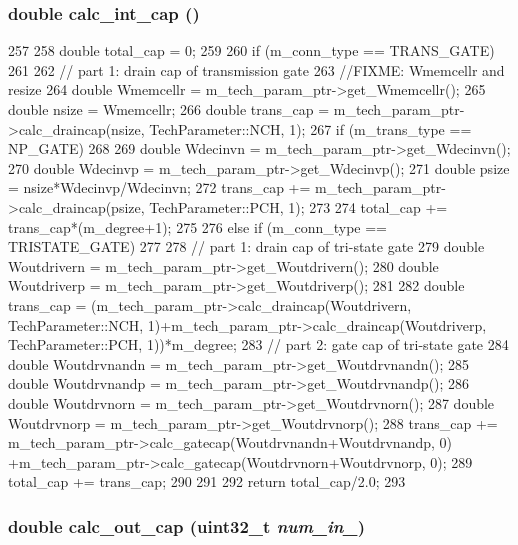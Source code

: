 \hypertarget{classCrossbar_a16e2ab6e99c8b2e72fb306b6d6094699}{
\subsubsection[{calc\_\-int\_\-cap}]{\setlength{\rightskip}{0pt plus 5cm}double calc\_\-int\_\-cap ()}}
\label{classCrossbar_a16e2ab6e99c8b2e72fb306b6d6094699}



\begin{DoxyCode}
257 {
258     double total_cap = 0;
259 
260     if (m_conn_type == TRANS_GATE)
261     {
262         // part 1: drain cap of transmission gate
263         //FIXME: Wmemcellr and resize
264         double Wmemcellr = m_tech_param_ptr->get_Wmemcellr();
265         double nsize = Wmemcellr;
266         double trans_cap = m_tech_param_ptr->calc_draincap(nsize, 
      TechParameter::NCH, 1);
267         if (m_trans_type == NP_GATE)
268         {
269             double Wdecinvn = m_tech_param_ptr->get_Wdecinvn();
270             double Wdecinvp = m_tech_param_ptr->get_Wdecinvp();
271             double psize = nsize*Wdecinvp/Wdecinvn;
272             trans_cap += m_tech_param_ptr->calc_draincap(psize, 
      TechParameter::PCH, 1);
273         }
274         total_cap += trans_cap*(m_degree+1);
275     }
276     else if (m_conn_type == TRISTATE_GATE)
277     {
278         // part 1: drain cap of tri-state gate
279         double Woutdrivern = m_tech_param_ptr->get_Woutdrivern();
280         double Woutdriverp = m_tech_param_ptr->get_Woutdriverp();
281 
282         double trans_cap = (m_tech_param_ptr->calc_draincap(Woutdrivern, 
      TechParameter::NCH, 1)+m_tech_param_ptr->calc_draincap(Woutdriverp, 
      TechParameter::PCH, 1))*m_degree;
283         // part 2: gate cap of tri-state gate
284         double Woutdrvnandn = m_tech_param_ptr->get_Woutdrvnandn();
285         double Woutdrvnandp = m_tech_param_ptr->get_Woutdrvnandp();
286         double Woutdrvnorn = m_tech_param_ptr->get_Woutdrvnorn();
287         double Woutdrvnorp = m_tech_param_ptr->get_Woutdrvnorp();
288         trans_cap += m_tech_param_ptr->calc_gatecap(Woutdrvnandn+Woutdrvnandp, 0)
      +m_tech_param_ptr->calc_gatecap(Woutdrvnorn+Woutdrvnorp, 0);
289         total_cap += trans_cap;
290     }
291 
292     return total_cap/2.0;
293 }
\end{DoxyCode}
\hypertarget{classCrossbar_a8dc00f1f67a20a1afb6dc4147044c9eb}{
\subsubsection[{calc\_\-out\_\-cap}]{\setlength{\rightskip}{0pt plus 5cm}double calc\_\-out\_\-cap ({\bf uint32\_\-t} {\em num\_\-in\_\-})}}
\label{classCrossbar_a8dc00f1f67a20a1afb6dc4147044c9eb}



